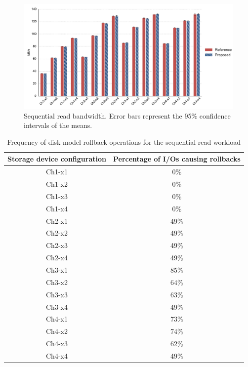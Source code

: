 \begin{figure}[htpb]
	\centering
	\includegraphics[width=\textwidth]{figures/ch6-fig-9.pdf}
	\caption[Sequential read bandwidth.]{\label{fig:ch6-fig-9}Sequential read bandwidth. Error bars represent the 95\% confidence intervals of the means.}
\end{figure}

\begin{table}[htbp]%
	\centering
	\caption{Frequency of disk model rollback operations for the sequential read workload}\label{tab:ch6-5-rollback}
	\noindent\begin{tabular}{cc}
		\toprule
		Storage device configuration &
		Percentage of I/Os causing rollbacks \\
		\midrule
		Ch1-x1 & 0\% \\
		Ch1-x2 & 0\% \\
		Ch1-x3 & 0\% \\
		Ch1-x4 & 0\% \\
		Ch2-x1 & 49\% \\
		Ch2-x2 & 49\% \\
		Ch2-x3 & 49\% \\
		Ch2-x4 & 49\% \\
		Ch3-x1 & 85\% \\
		Ch3-x2 & 64\% \\
		Ch3-x3 & 63\% \\
		Ch3-x4 & 49\% \\
		Ch4-x1 & 73\% \\
		Ch4-x2 & 74\% \\
		Ch4-x3 & 62\% \\
		Ch4-x4 & 49\% \\
		\bottomrule
	\end{tabular}
\end{table}%

